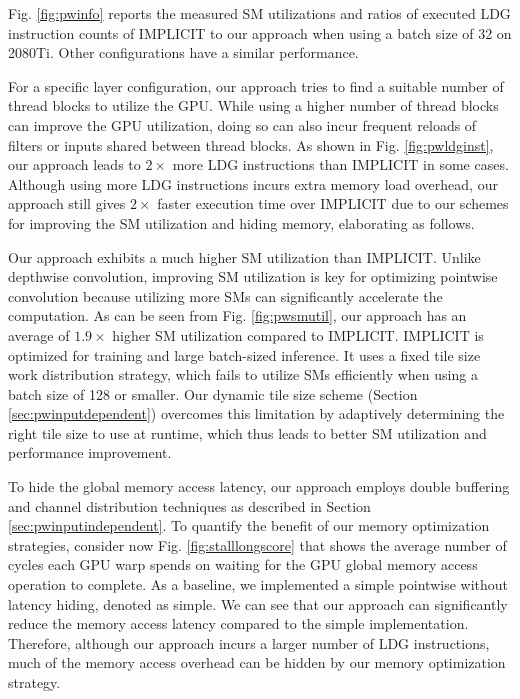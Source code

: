 Fig. \ref{fig:pwinfo} reports the measured SM utilizations and ratios of executed LDG instruction counts of IMPLICIT to our approach when using a batch size of 32 on 2080Ti. Other configurations have a similar performance.


For a specific layer configuration, our approach tries to find a suitable number of thread blocks to utilize the GPU. While using a higher
number of thread blocks can improve the GPU utilization, doing so can also incur frequent reloads of filters or inputs shared between
thread blocks. As shown in Fig. \ref{fig:pwldginst}, our approach leads to $2\times$ more LDG instructions than IMPLICIT in some
cases. Although using more LDG instructions incurs extra memory load overhead, our approach still gives $2\times$ faster execution time
over IMPLICIT due to our schemes for improving the SM utilization and hiding memory, elaborating as follows.


Our approach exhibits a much higher SM utilization than IMPLICIT. Unlike depthwise convolution, improving SM utilization is key for
optimizing pointwise convolution because utilizing more SMs can significantly accelerate the computation.	As can be seen from Fig.
\ref{fig:pwsmutil}, our approach has an average of $1.9\times$ higher SM utilization compared to IMPLICIT. IMPLICIT is
optimized for training and large batch-sized inference. It uses a fixed tile size work distribution strategy, which fails to utilize SMs
efficiently when using a batch size of 128 or smaller. Our dynamic tile size scheme (Section \ref{sec:pwinputdependent}) overcomes this
limitation by adaptively determining the right tile size to use at runtime, which thus leads to better SM utilization and performance improvement.

To hide the global memory access latency, our approach employs double buffering and channel distribution techniques as described in
Section \ref{sec:pwinputindependent}. To quantify the benefit of our memory optimization strategies, consider now  Fig. \ref{fig:stalllongscore} that
shows the average number of cycles each GPU warp spends on waiting for the GPU global memory access operation to complete. As a baseline,
we implemented a simple pointwise without latency hiding, denoted as simple. We can see that our approach can significantly reduce the
memory access latency compared to the simple implementation. Therefore, although our approach incurs a larger number of LDG instructions,
much of the memory access overhead can be hidden by our memory optimization strategy.



